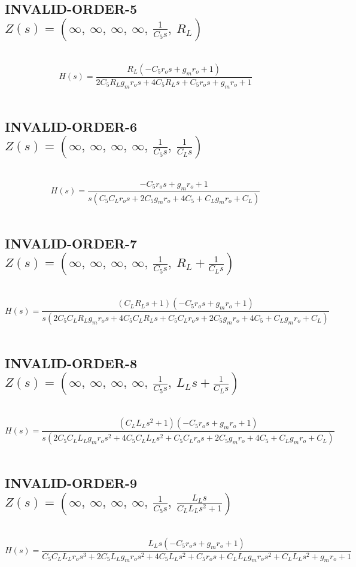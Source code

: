 \documentclass{article}
\begin{document}
\subsection{INVALID-ORDER-5 $Z(s) = \left( \infty, \  \infty, \  \infty, \  \infty, \  \frac{1}{C_{5} s}, \  R_{L}\right)$ } \ 
\textbf{\[H(s) = \frac{R_{L} \left(- C_{5} r_{o} s + g_{m} r_{o} + 1\right)}{2 C_{5} R_{L} g_{m} r_{o} s + 4 C_{5} R_{L} s + C_{5} r_{o} s + g_{m} r_{o} + 1}\] } \ 
\subsection{INVALID-ORDER-6 $Z(s) = \left( \infty, \  \infty, \  \infty, \  \infty, \  \frac{1}{C_{5} s}, \  \frac{1}{C_{L} s}\right)$ } \ 
\textbf{\[H(s) = \frac{- C_{5} r_{o} s + g_{m} r_{o} + 1}{s \left(C_{5} C_{L} r_{o} s + 2 C_{5} g_{m} r_{o} + 4 C_{5} + C_{L} g_{m} r_{o} + C_{L}\right)}\] } \ 
\subsection{INVALID-ORDER-7 $Z(s) = \left( \infty, \  \infty, \  \infty, \  \infty, \  \frac{1}{C_{5} s}, \  R_{L} + \frac{1}{C_{L} s}\right)$ } \ 
\textbf{\[H(s) = \frac{\left(C_{L} R_{L} s + 1\right) \left(- C_{5} r_{o} s + g_{m} r_{o} + 1\right)}{s \left(2 C_{5} C_{L} R_{L} g_{m} r_{o} s + 4 C_{5} C_{L} R_{L} s + C_{5} C_{L} r_{o} s + 2 C_{5} g_{m} r_{o} + 4 C_{5} + C_{L} g_{m} r_{o} + C_{L}\right)}\] } \ 
\subsection{INVALID-ORDER-8 $Z(s) = \left( \infty, \  \infty, \  \infty, \  \infty, \  \frac{1}{C_{5} s}, \  L_{L} s + \frac{1}{C_{L} s}\right)$ } \ 
\textbf{\[H(s) = \frac{\left(C_{L} L_{L} s^{2} + 1\right) \left(- C_{5} r_{o} s + g_{m} r_{o} + 1\right)}{s \left(2 C_{5} C_{L} L_{L} g_{m} r_{o} s^{2} + 4 C_{5} C_{L} L_{L} s^{2} + C_{5} C_{L} r_{o} s + 2 C_{5} g_{m} r_{o} + 4 C_{5} + C_{L} g_{m} r_{o} + C_{L}\right)}\] } \ 
\subsection{INVALID-ORDER-9 $Z(s) = \left( \infty, \  \infty, \  \infty, \  \infty, \  \frac{1}{C_{5} s}, \  \frac{L_{L} s}{C_{L} L_{L} s^{2} + 1}\right)$ } \ 
\textbf{\[H(s) = \frac{L_{L} s \left(- C_{5} r_{o} s + g_{m} r_{o} + 1\right)}{C_{5} C_{L} L_{L} r_{o} s^{3} + 2 C_{5} L_{L} g_{m} r_{o} s^{2} + 4 C_{5} L_{L} s^{2} + C_{5} r_{o} s + C_{L} L_{L} g_{m} r_{o} s^{2} + C_{L} L_{L} s^{2} + g_{m} r_{o} + 1}\] } \ 
\end{document}

